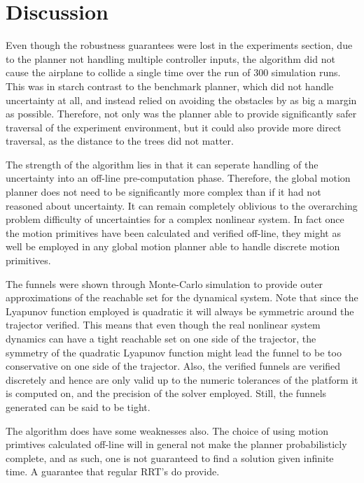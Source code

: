 \chapter{Discussion}
\label{chp:discussion}

Even though the robustness guarantees were lost in the experiments section, due
to the planner not handling multiple controller inputs, the \rrtfunnel{}
algorithm did not cause the airplane to collide a single time over the run of
\(300\) simulation runs. This was in starch contrast to the benchmark planner,
which did not handle uncertainty at all, and instead relied on avoiding the
obstacles by as big a margin as possible. Therefore, not only was the
\rrtfunnel{} planner able to provide significantly safer traversal of the
experiment environment, but it could also provide more direct traversal, as the
distance to the trees did not matter.

The strength of the algorithm lies in that it can seperate handling of the
uncertainty into an off-line pre-computation phase. Therefore, the global motion
planner does not need to be significantly more complex than if it had not
reasoned about uncertainty. It can remain completely oblivious to
the overarching problem difficulty of uncertainties for a complex nonlinear
system. In fact once the motion primitives have been calculated and verified
off-line, they might as well be employed in any global motion planner able to
handle discrete motion primitives.

The funnels were shown through Monte-Carlo simulation to provide outer
approximations of the reachable set for the dynamical system. Note that since
the Lyapunov function employed is quadratic it will always be symmetric around
the trajector verified. This means that even though the real nonlinear system
dynamics can have a tight reachable set on one side of the trajector, the
symmetry of the quadratic Lyapunov function might lead the funnel to be too
conservative on one side of the trajector. Also, the verified funnels are
verified discretely and hence are only valid up to the numeric tolerances of the
platform it is computed on, and the precision of the solver employed. Still, the
funnels generated can be said to be tight.

The algorithm does have some weaknesses also. The choice of using motion
primtives calculated off-line will in general not make the planner
probabilisticly complete, and as such, one is not guaranteed to find a solution
given infinite time. A guarantee that regular \ac{RRT}'s do provide.

